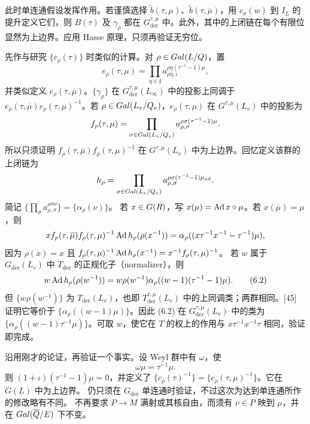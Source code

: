 此时单连通假设发挥作用。若谨慎选择
$\widetilde b(\tau,\mu)$、$\widetilde b(\tau,\overline\mu)$，用
$c_\sigma(w)$ 到 $I_L$ 的提升定义它们，则 $B(\tau)$ 及 $\gamma_\rho$ 都在
$G_{\mathrm{der}}^{\tau,\mu}$ 中。此外，其中的上闭链在每个有限位显然为上边界。应用
Hasse 原理，只须再验证无穷位。

先作与研究 $\{c_\rho(\tau)\}$ 时类似的计算。对 $\rho\in Gal(L/Q)$，置
\[
e_\rho(\tau,\mu)=\prod_{\eta\in\mathfrak f}
a_{\rho\eta,\iota}^{\rho\eta(\tau^{-1}-1)\mu},
\]
并类似定义 $e_\rho(\tau,\overline\mu)$。$\{\gamma_\rho\}$ 在
$G_{\mathrm{der}}^{\tau,\mu}(L_\infty)$ 中的投影上同调于
$e_\rho(\tau,\overline\mu)e_\rho(\tau,\mu)^{-1}$。若
$\rho\in Gal(L_v/Q_v)$，$e_\rho(\tau,\mu)$ 在 $G^{\tau,\mu}(L_v)$ 中的投影为
\[
f_\rho(\tau,\mu)=\prod_{\sigma\in Gal(L_v/Q_v)}
a_{\rho,\sigma}^{\rho\sigma(\tau^{-1}-1)\mu}.
\]
所以只须证明 $f_\rho(\tau,\overline\mu)f_\rho(\tau,\mu)^{-1}$ 在
$G^{\tau,\mu}(L_v)$ 中为上边界。回忆定义该群的上闭链为
\[
h_\rho=\prod_{\sigma\in Gal(L_v/Q_v)}
a_{\rho,\sigma}^{\rho\sigma(\tau^{-1}-1)\mu_{ad}}.
\]
简记 $\{\prod_\sigma a_{\rho,\sigma}^{\rho\sigma\nu}\}=\{\alpha_\rho(\nu)\}$。
若 $x\in G(R)$，写 $x(\mu)=\operatorname{Ad} x\circ\mu$。若 $x(\overline\mu)=\mu$，则
\[
xf_\rho(\tau,\overline\mu)f_\rho(\tau,\mu)^{-1}
\operatorname{Ad} h_\rho(\rho(x^{-1}))
=\alpha_\rho((x\tau^{-1}x^{-1}-\tau^{-1})\mu),
\]
因为 $\rho(x)=x$ 且
$f_\rho(\tau,\mu)^{-1}\operatorname{Ad} h_\rho(x^{-1})=x^{-1}f_\rho(\tau,\mu)^{-1}$。
若 $w$ 属于 $G_{\mathrm{der}}(L_v)$ 中 $T_{\mathrm{der}}$ 的正规化子（normalizer），则
\begin{equation}
w\operatorname{Ad} h_\rho(\rho(w^{-1}))
=w\rho(w^{-1})\alpha_\rho((w-1)(\tau^{-1}-1)\mu).\tag{6.2}
\end{equation}
但 $\{w\rho(w^{-1})\}$ 为 $T_{\mathrm{der}}(L_v)$，也即
$T_{\mathrm{der}}^{\tau,\mu}(L_v)$ 中的上同调类；两群相同。[45] 证明它等价于
$\{\alpha_\rho((w-1)\mu)\}$。因此 (6.2) 在
$G_{\mathrm{der}}^{\tau,\mu}(L_v)$ 中的类为
$\{\alpha_\rho((w-1)\tau^{-1}\mu)\}$。可取 $w$，使它在 $T$ 的权上的作用与
$x\tau^{-1}x^{-1}\tau$ 相同，验证即完成。

沿用刚才的论证，再验证一个事实。设 Weyl 群中有 $\omega$，使
\begin{equation}\omega\mu=\tau^{-1}\mu.\tag{6.3}\end{equation}
则 $(1+\iota)(\tau^{-1}-1)\mu=0$，并定义了
$\{c_\rho(\tau)^{-1}\}=\{c_\rho(\tau,\mu)^{-1}\}$。它在 $G(L)$ 中为上边界。
仍只须在 $G_{\mathrm{der}}$ 单连通时验证，不过这次为达到单连通所作的修改略有不同。
不再要求 $P\to M$ 满射或其核自由，而须有 $\nu\in P$ 映到 $\mu$，并在
$Gal(\overline{Q}/E)$ 下不变。

